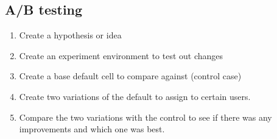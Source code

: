\subsection{A/B testing}\label{sub:a_b_testing}

\begin{enumerate}
	\item Create a hypothesis or idea
	\item Create an experiment environment to test out changes
	\item Create a base default cell to compare against (control case)
	\item Create two variations of the default to assign to certain users.
	\item Compare the two variations with the control to see if there was any improvements and which one was best.
\end{enumerate}
